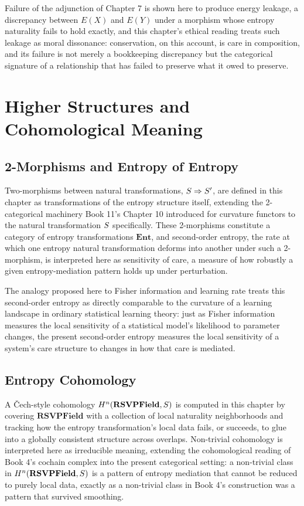Failure of the adjunction of Chapter 7 is shown here to produce energy leakage, a discrepancy between $E(X)$ and $E(Y)$ under a morphism whose entropy naturality fails to hold exactly, and this chapter's ethical reading treats such leakage as moral dissonance: conservation, on this account, is care in composition, and its failure is not merely a bookkeeping discrepancy but the categorical signature of a relationship that has failed to preserve what it owed to preserve.

\part{Higher Structures and Cohomological Meaning}

\chapter{2-Morphisms and Entropy of Entropy}

Two-morphisms between natural transformations, $S \Rightarrow S'$, are defined in this chapter as transformations of the entropy structure itself, extending the 2-categorical machinery Book 11's Chapter 10 introduced for curvature functors to the natural transformation $S$ specifically. These 2-morphisms constitute a category of entropy transformations $\mathbf{Ent}$, and second-order entropy, the rate at which one entropy natural transformation deforms into another under such a 2-morphism, is interpreted here as sensitivity of care, a measure of how robustly a given entropy-mediation pattern holds up under perturbation.

The analogy proposed here to Fisher information and learning rate treats this second-order entropy as directly comparable to the curvature of a learning landscape in ordinary statistical learning theory: just as Fisher information measures the local sensitivity of a statistical model's likelihood to parameter changes, the present second-order entropy measures the local sensitivity of a system's care structure to changes in how that care is mediated.

\chapter{Entropy Cohomology}

A Čech-style cohomology $H^n(\mathbf{RSVPField}, S)$ is computed in this chapter by covering $\mathbf{RSVPField}$ with a collection of local naturality neighborhoods and tracking how the entropy transformation's local data fails, or succeeds, to glue into a globally consistent structure across overlaps. Non-trivial cohomology is interpreted here as irreducible meaning, extending the cohomological reading of Book 4's cochain complex into the present categorical setting: a non-trivial class in $H^n(\mathbf{RSVPField}, S)$ is a pattern of entropy mediation that cannot be reduced to purely local data, exactly as a non-trivial class in Book 4's construction was a pattern that survived smoothing.

